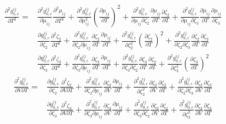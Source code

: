 \documentclass[english]{../thermomemo/thermomemo}
\newcommand{\z}{\zeta}
\begin{document}
\begin{equation}
\begin{split}
\frac{\partial^2 g_{0,c}^{ij}}{\partial T^2}=&\frac{\partial^2 g_{0,c}^{ij}}{\partial \mu_{ij}}\frac{\partial^2 \mu_{ij}}{\partial T^2}+\frac{\partial^2 g_{0,c}^{ij}}{\partial \mu_{ij}^2}\left(\frac{\partial \mu_{ij}}{\partial T}\right)^2+\frac{\partial^2 g_{0,c}^{ij}}{\partial \mu_{ij}\partial \z_2}\frac{\partial \mu_{ij}}{\partial T}\frac{\partial \z_{2}}{\partial T}+\frac{\partial^2 g_{0,c}^{ij}}{\partial \mu_{ij}\partial \z_3}\frac{\partial \mu_{ij}}{\partial T}\frac{\partial \mu_{ij}}{\partial \z_3}\\
&\frac{\partial g_{0,c}^{ij}}{\partial \z_{2}}\frac{\partial^2 \z_{2}}{\partial T^2}+\frac{\partial^2 g_{0,c}^{ij}}{\partial \z_{2}\partial \mu_{ij}}\frac{\partial \z_{2}}{\partial T}\frac{\partial \mu_{ij}}{\partial T}+\frac{\partial^2 g_{0,c}^{ij}}{\partial \z_{2}^2}\left(\frac{\partial \z_{2}}{\partial T}\right)^2+\frac{\partial^2 g_{0,c}^{ij}}{\partial \z_{2}\partial \z_3}\frac{\partial \z_{2}}{\partial T}\frac{\partial \z_{3}}{\partial T}\\
&\frac{\partial g_{0,c}^{ij}}{\partial \z_{3}}\frac{\partial^2 \z_{3}}{\partial T^2}+\frac{\partial^2 g_{0,c}^{ij}}{\partial \z_{3}\partial\mu_{ij}}\frac{\partial \z_{3}}{\partial T}\frac{\partial \mu_{ij}}{\partial T}+\frac{\partial^2 g_{0,c}^{ij}}{\partial \z_{3}\partial \z_{2}}\frac{\partial \z_{3}}{\partial T}\frac{\partial \z_{2}}{\partial T}+\frac{\partial^2 g_{0,c}^{ij}}{\partial \z_{3}^2}\left(\frac{\partial \z_{3}}{\partial T}\right)^2
\end{split}
\end{equation}
\begin{equation}
\begin{split}
\frac{\partial^2 g_{0,c}^{ij}}{\partial V\partial T}=&\frac{\partial g_{0,c}^{ij}}{\partial \z_{2}}\frac{\partial^2 \z_{2}}{\partial V\partial T}+\frac{\partial^2 g_{0,c}^{ij}}{\partial \z_{2}\partial \mu_{ij}}\frac{\partial \z_{2}}{\partial V}\frac{\partial \mu_{ij}}{\partial T}+\frac{\partial^2 g_{0,c}^{ij}}{\partial \z_{2}^2}\frac{\partial \z_{2}}{\partial V}\frac{\partial \z_{2}}{\partial T}+\frac{\partial^2 g_{0,c}^{ij}}{\partial \z_{2}\partial \z_3}\frac{\partial \z_{2}}{\partial V}\frac{\partial \z_{3}}{\partial T} \\
&\frac{\partial g_{0,c}^{ij}}{\partial \z_{3}}\frac{\partial^2 \z_{3}}{\partial V\partial T}+\frac{\partial^2 g_{0,c}^{ij}}{\partial \z_{3}\partial\mu_{ij}}\frac{\partial \z_{3}}{\partial V}\frac{\partial \mu_{ij}}{\partial T} +\frac{\partial^2 g_{0,c}^{ij}}{\partial \z_{3}\partial \z_2}\frac{\partial \z_{3}}{\partial V}\frac{\partial \z_{2}}{\partial T} +\frac{\partial^2 g_{0,c}^{ij}}{\partial \z_{3}^2}\frac{\partial \z_{3}}{\partial V}\frac{\partial \z_{3}}{\partial T}  
\end{split}
\end{equation}
\end{document}
